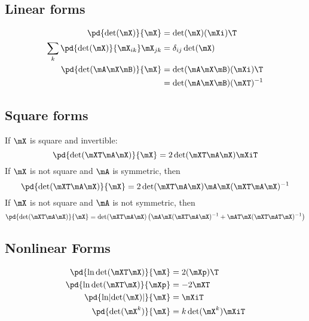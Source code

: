 \subsection{Linear forms}

\begin{align}
\pd{\det(\mX)}{\mX} &= \det(\mX)(\mXi)\T \\
\sum_k \pd{\det(\mX)}{\mX_{ik}}\mX_{jk} &= \delta_{ij} \det(\mX)   \\
\pd{\det(\mA\mX\mB)}{\mX} &= \det(\mA\mX\mB)(\mXi)\T \\
                          &= \det(\mA\mX\mB)(\mXT)^{-1}
\end{align}

\subsection{Square forms}

If $\mX$ is square and invertible:
\begin{equation}
\pd{\det(\mXT\mA\mX)}{\mX} = 2 \det(\mXT \mA \mX)\mXiT
\end{equation}
If $\mX$ is not square and $\mA$ is symmetric, then
\begin{equation}
\pd{\det(\mXT \mA \mX)}{\mX} = 2 \det(\mXT\mA\mX)\mA\mX(\mXT\mA\mX)^{-1}
\end{equation}
If $\mX$ is not square and $\mA$ is not symmetric, then
\begin{equation}
\pd{\det(\mXT\mA\mX)}{\mX} = \det(\mXT\mA\mX)\left(\mA\mX(\mXT\mA\mX)^{-1}+\mAT\mX(\mXT\mAT\mX)^{-1}\right)
\end{equation}

\subsection{Nonlinear Forms}
\begin{align}
\pd{\ln\det(\mXT\mX)}{\mX}         &= 2(\mXp)\T \\
\pd{\ln\det(\mXT\mX)}{\mXp}        &= -2\mXT    \\
\pd{\ln\lvert\det(\mX)\rvert}{\mX} &= \mXiT     \\
\pd{\det(\mX^k)}{\mX}              &= k \det(\mX^k) \mXiT
\end{align}